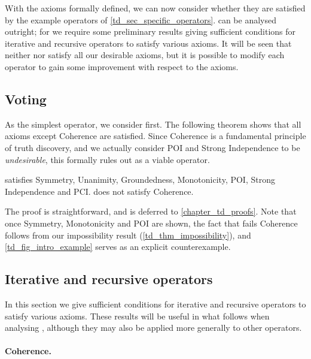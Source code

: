 With the axioms formally defined, we can now consider whether they are
satisfied by the example operators of \cref{td_sec_specific_operators}.
\voting{} can be analysed outright; for \sums{} we require some preliminary
results giving sufficient conditions for iterative and recursive operators to
satisfy various axioms. It will be seen that neither \voting{} nor \sums{}
satisfy all our desirable axioms, but it is possible to modify each operator to
gain some improvement with respect to the axioms.

\subsection{Voting}

As the simplest operator, we consider \voting{} first. The following
theorem shows that all axioms except Coherence are satisfied. Since Coherence
is a fundamental principle of truth discovery, and we actually consider POI and
Strong Independence to be \emph{undesirable}, this formally rules out \voting{} as a
viable operator.

\begin{theorem}
\label{td_thm_voting_axioms}
\voting{} satisfies Symmetry, Unanimity, Groundedness, Monotonicity, POI, Strong
Independence and PCI. \voting{} does not satisfy Coherence.
\end{theorem}

The proof is straightforward, and is deferred to \cref{chapter_td_proofs}.  Note that
once Symmetry, Monotonicity and POI are shown, the fact that \voting{} fails
Coherence follows from our impossibility result (\cref{td_thm_impossibility}), and
\cref{td_fig_intro_example} serves as an explicit counterexample.

\subsection{Iterative and recursive operators}
\label{td_sec_axioms_for_iterative_and_recursive_operators}

In this section we give sufficient conditions for iterative and recursive
operators to satisfy various axioms. These results will be useful in what
follows when analysing \sums{}, although they may also be applied more
generally to other operators.

\paragraph{Coherence.}

